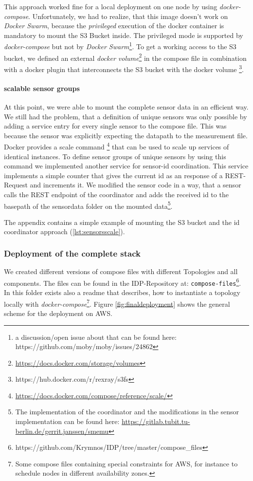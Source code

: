 This approach worked fine for a local deployment on one node by using \emph{docker-compose}. Unfortunately, we had to realize, that this image doesn't work on \emph{Docker Swarm}, because the \emph{privileged} execution of the docker container is mandatory to mount the S3 Bucket inside. The privileged mode is supported by \emph{docker-compose} but not by \emph{Docker Swarm}\footnote{a discussion/open issue about that can be found here: https://github.com/moby/moby/issues/24862}.
To get a working access to the S3 bucket, we defined an external \emph{docker volume}\footnote{\url{https://docs.docker.com/storage/volumes}} in the compose file in combination with a docker plugin that interconnects the S3 bucket with the docker volume \footnote{https://hub.docker.com/r/rexray/s3fs}.

\paragraph*{scalable sensor groups}
At this point, we were able to mount the complete sensor data in an efficient way. We still had the problem, that a definition of unique sensors was only possible by adding a service entry for every single sensor to the compose file.
This was because the sensor was explicitly expecting the datapath to the measurement file.
Docker provides a scale command \footnote{\url{https://docs.docker.com/compose/reference/scale/}} that can be used to scale up services of identical instances. To define sensor groups of unique sensors by using this command we implemented another service for sensor-id coordination. This service implements a simple counter that gives the current id as an response of a REST-Request and increments it.
We modified the sensor code in a way, that a sensor calls the REST endpoint of the coordinator and adds the received id to the basepath of the sensordata folder on the mounted data\footnote{The implementation of the coordinator and the modifications in the sensor implementation can be found here: \url{https://gitlab.tubit.tu-berlin.de/gerrit.janssen/smemu}}. 

The appendix contains a simple example of mounting the S3 bucket and the id coordinator approach (\ref{lst:sensorsscale}).


\subsubsection*{Deployment of the complete stack}
We created different versions of compose files with different Topologies and all components. The files can be found in the IDP-Repository at: \texttt{compose-files}\footnote{https://github.com/Krymnos/IDP/tree/master/compose\_files}. In this folder exists also a readme that describes, how to instantiate a topology locally  with \emph{docker-compose}\footnote{ Some compose files containing special constraints for AWS, for instance to schedule nodes in different availability zones.}. Figure \ref{fig:finaldeployment} shows the general scheme for the deployment on AWS.


